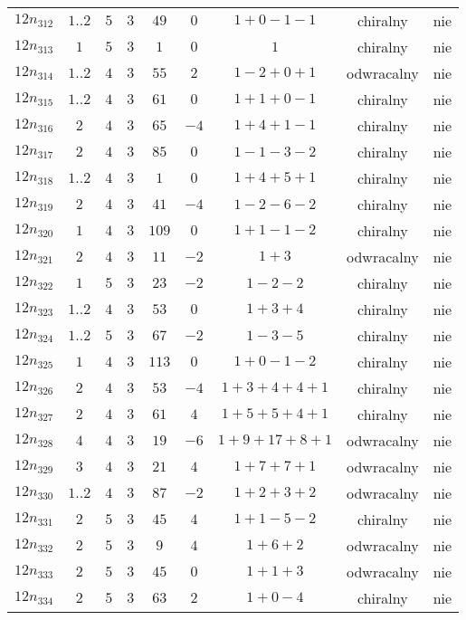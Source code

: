 \begin{longtable}{ccccccccc}
$12n_{312}$ & $1..2$ & $5$ & $3$ & $49$ & $0$ & $1+0-1-1$ & chiralny & nie \\
$12n_{313}$ & $1$ & $5$ & $3$ & $1$ & $0$ & $1$ & chiralny & nie \\
$12n_{314}$ & $1..2$ & $4$ & $3$ & $55$ & $2$ & $1-2+0+1$ & odwracalny & nie \\
$12n_{315}$ & $1..2$ & $4$ & $3$ & $61$ & $0$ & $1+1+0-1$ & chiralny & nie \\
$12n_{316}$ & $2$ & $4$ & $3$ & $65$ & $-4$ & $1+4+1-1$ & chiralny & nie \\
$12n_{317}$ & $2$ & $4$ & $3$ & $85$ & $0$ & $1-1-3-2$ & chiralny & nie \\
$12n_{318}$ & $1..2$ & $4$ & $3$ & $1$ & $0$ & $1+4+5+1$ & chiralny & nie \\
$12n_{319}$ & $2$ & $4$ & $3$ & $41$ & $-4$ & $1-2-6-2$ & chiralny & nie \\
$12n_{320}$ & $1$ & $4$ & $3$ & $109$ & $0$ & $1+1-1-2$ & chiralny & nie \\
$12n_{321}$ & $2$ & $4$ & $3$ & $11$ & $-2$ & $1+3$ & odwracalny & nie \\
$12n_{322}$ & $1$ & $5$ & $3$ & $23$ & $-2$ & $1-2-2$ & chiralny & nie \\
$12n_{323}$ & $1..2$ & $4$ & $3$ & $53$ & $0$ & $1+3+4$ & chiralny & nie \\
$12n_{324}$ & $1..2$ & $5$ & $3$ & $67$ & $-2$ & $1-3-5$ & chiralny & nie \\
$12n_{325}$ & $1$ & $4$ & $3$ & $113$ & $0$ & $1+0-1-2$ & chiralny & nie \\
$12n_{326}$ & $2$ & $4$ & $3$ & $53$ & $-4$ & $1+3+4+4+1$ & chiralny & nie \\
$12n_{327}$ & $2$ & $4$ & $3$ & $61$ & $4$ & $1+5+5+4+1$ & chiralny & nie \\
$12n_{328}$ & $4$ & $4$ & $3$ & $19$ & $-6$ & $1+9+17+8+1$ & odwracalny & nie \\
$12n_{329}$ & $3$ & $4$ & $3$ & $21$ & $4$ & $1+7+7+1$ & odwracalny & nie \\
$12n_{330}$ & $1..2$ & $4$ & $3$ & $87$ & $-2$ & $1+2+3+2$ & odwracalny & nie \\
$12n_{331}$ & $2$ & $5$ & $3$ & $45$ & $4$ & $1+1-5-2$ & chiralny & nie \\
$12n_{332}$ & $2$ & $5$ & $3$ & $9$ & $4$ & $1+6+2$ & odwracalny & nie \\
$12n_{333}$ & $2$ & $5$ & $3$ & $45$ & $0$ & $1+1+3$ & odwracalny & nie \\
$12n_{334}$ & $2$ & $5$ & $3$ & $63$ & $2$ & $1+0-4$ & chiralny & nie \\

\end{longtable}
